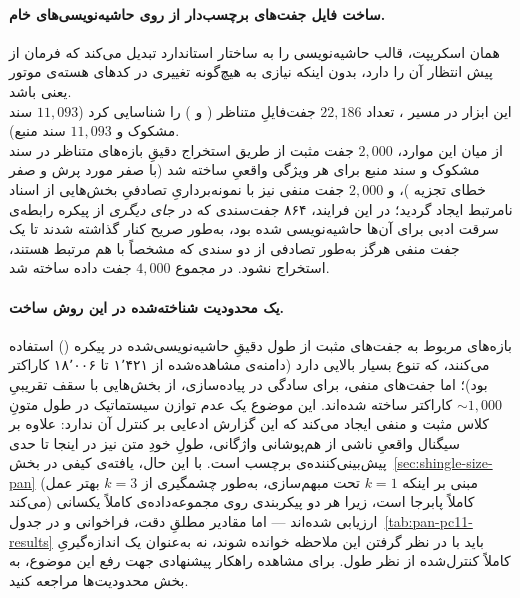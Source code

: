 \documentclass[11pt,a4paper]{article}
\begin{document}
	\paragraph{ساخت فایل  جفت‌های برچسب‌دار از روی حاشیه‌نویسی‌های خام.} همان اسکریپت، قالب حاشیه‌نویسی را به ساختار استاندارد  تبدیل می‌کند که فرمان  از پیش انتظار آن را دارد، بدون اینکه نیازی به هیچ‌گونه تغییری در کدهای هسته‌ی موتور یعنی  باشد.\\ این ابزار در مسیر ، تعداد $22{,}186$ جفت‌فایلِ متناظر ( و ) را شناسایی کرد ($11{,}093$ سند مشکوک و $11{,}093$ سند منبع). \\ از میان این موارد، $2{,}000$ جفت مثبت از طریق استخراج دقیقِ بازه‌های متناظر در سند مشکوک و سند منبع برای هر ویژگی واقعیِ  ساخته شد (با صفر مورد پرش و صفر خطای تجزیه )، و $2{,}000$ جفت منفی نیز با نمونه‌برداریِ تصادفیِ بخش‌هایی از اسناد نامرتبط ایجاد گردید؛ در این فرایند، ۸۶۴ جفت‌سندی که در \emph{جای دیگری} از پیکره رابطه‌ی سرقت ادبی برای آن‌ها حاشیه‌نویسی شده بود، به‌طور صریح کنار گذاشته شدند تا یک جفت منفی هرگز به‌طور تصادفی از دو سندی که مشخصاً با هم مرتبط هستند، استخراج نشود. در مجموع $4{,}000$ جفت داده ساخته شد.
	
	\paragraph{یک محدودیت شناخته‌شده در این روش ساخت.} بازه‌های مربوط به جفت‌های مثبت از طول دقیقِ حاشیه‌نویسی‌شده در پیکره () استفاده می‌کنند، که تنوع بسیار بالایی دارد (دامنه‌ی مشاهده‌شده از ۱٬۴۲۱ تا ۱۸٬۰۰۶ کاراکتر بود)؛ اما جفت‌های منفی، برای سادگی در پیاده‌سازی، از بخش‌هایی با سقف تقریبیِ $\sim 1{,}000$ کاراکتر ساخته شده‌اند. این موضوع یک عدم توازن سیستماتیک در طول متونِ کلاس مثبت و منفی ایجاد می‌کند که این گزارش ادعایی بر کنترل آن ندارد: علاوه بر سیگنال واقعیِ ناشی از هم‌پوشانی واژگانی، طولِ خودِ متن نیز در اینجا تا حدی پیش‌بینی‌کننده‌ی برچسب است. با این حال، یافته‌ی کیفی در بخش~\ref{sec:shingle-size-pan} (مبنی بر اینکه $k=1$ تحت مبهم‌سازی، به‌طور چشمگیری از $k=3$ بهتر عمل می‌کند) کاملاً پابرجا است، زیرا هر دو پیکربندی روی مجموعه‌داده‌ی کاملاً یکسانی ارزیابی شده‌اند — اما مقادیر مطلقِ دقت، فراخوانی و  در جدول~\ref{tab:pan-pc11-results} باید با در نظر گرفتن این ملاحظه خوانده شوند، نه به‌عنوان یک اندازه‌گیریِ کاملاً کنترل‌شده از نظر طول. برای مشاهده راهکار پیشنهادی جهت رفع این موضوع، به بخش محدودیت‌ها مراجعه کنید.
	
\end{document}
